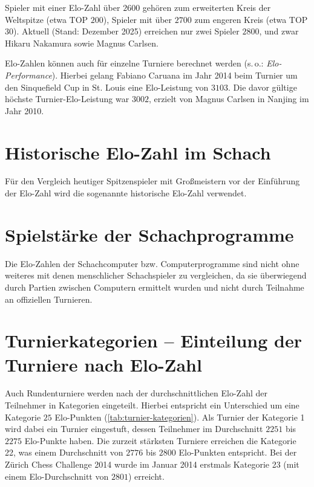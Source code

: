 Spieler mit einer Elo-Zahl über $2600$ gehören zum erweiterten Kreis der Weltspitze (etwa TOP $200$), Spieler mit über $2700$ zum engeren Kreis (etwa TOP $30$). Aktuell (Stand: Dezember 2025) erreichen nur zwei Spieler $2800$, und zwar Hikaru Nakamura sowie Magnus Carlsen.

Elo-Zahlen können auch für einzelne Turniere berechnet werden (s.\,o.: \textit{Elo-Performance}). Hierbei gelang Fabiano Caruana im Jahr 2014 beim Turnier um den Sinquefield Cup in St. Louis eine Elo-Leistung von $3103$. Die davor gültige höchste Turnier-Elo-Leistung war $3002$, erzielt von Magnus Carlsen in Nanjing im Jahr 2010. \cite{loeffler2014}


\section{Historische Elo-Zahl im Schach}

Für den Vergleich heutiger Spitzenspieler mit Großmeistern vor der Einführung der Elo-Zahl wird die sogenannte historische Elo-Zahl verwendet. %

\section{Spielstärke der Schachprogramme}

Die Elo-Zahlen der Schachcomputer bzw. Computerprogramme sind nicht ohne weiteres mit denen menschlicher Schachspieler zu vergleichen, da sie überwiegend durch Partien zwischen Computern ermittelt wurden und nicht durch Teilnahme an offiziellen Turnieren. %


\section{Turnierkategorien -- Einteilung der Turniere nach Elo-Zahl}

Auch Rundenturniere werden nach der durchschnittlichen Elo-Zahl der Teilnehmer in Kategorien eingeteilt. Hierbei entspricht ein Unterschied um eine Kategorie $25$ Elo-Punkten (\autoref{tab:turnier-kategorien}). Als Turnier der Kategorie 1 wird dabei ein Turnier eingestuft, dessen Teilnehmer im Durchschnitt $2251$ bis $2275$ Elo-Punkte haben. Die zurzeit stärksten Turniere erreichen die Kategorie 22, was einem Durchschnitt von $2776$ bis $2800$ Elo-Punkten entspricht. Bei der Zürich Chess Challenge 2014 wurde im Januar 2014 erstmals Kategorie 23 (mit einem Elo-Durchschnitt von $2801$) erreicht.